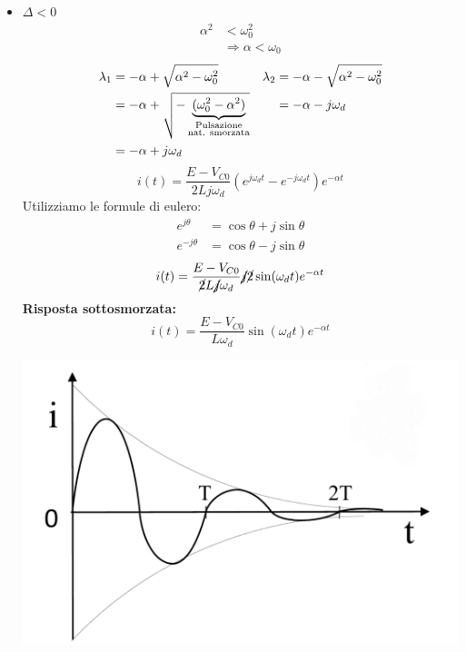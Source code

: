 \documentclass{article}
\begin{document}
\begin{itemize}
        \item $\Delta < 0$
        \begin{align*}
            \alpha^2 &< \omega^2_0 \\
            &\Rightarrow \alpha < \omega_0
        \end{align*}
        \begin{align*}
            \lambda_1 &= -\alpha + \sqrt{\alpha^2-\omega_0^2} & \lambda_2 &= -\alpha - \sqrt{\alpha^2-\omega_0^2} \\
            &= - \alpha + \sqrt{-\underbrace{(\omega_0^2 -\alpha^2)}_{\substack{\text{Pulsazione}\\\text{nat. smorzata}}}} & &=- \alpha - j \omega_d\\
            &= - \alpha + j \omega_d
        \end{align*}
        \[i(t) = \frac{E-V_{C0}}{2Lj \omega_d} \left(e^{j \omega_d t} - e^{-j \omega_d t}\right)e^{-\alpha t}\]
        Utilizziamo le formule di eulero:
        \begin{align*}
            e^{j \theta} &= \cos \theta + j \sin \theta\\
            e^{-j \theta} &= \cos \theta - j \sin \theta
        \end{align*}
        \[i(t) = \frac{E-V_{C0}}{\cancel{2}L\cancel{j} \omega_d} \cancel{j} \cancel{2} \sin (\omega_d t) e^{-\alpha t}\]
        \textbf{Risposta sottosmorzata:}
        \[i(t) = \frac{E-V_{C0}}{L \omega_d}  \sin (\omega_d t) e^{-\alpha t}\]
        \begin{center}
            \includegraphics[scale=0.25]{Image/RLC_4.png}
        \end{center}
    \end{itemize}
\end{document}
